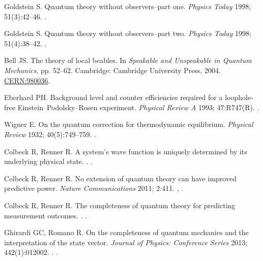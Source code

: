 \documentclass[DIV=calc,fontsize=12pt]{scrartcl} %
\theoremstyle{definition}
\theoremstyle{plain}
\begin{document}
\begin{thebibliography}{999}
Goldstein S.
\newblock Quantum theory without observers--part one.
\newblock \emph{Physics Today} 1998; 51(3):42--46.
\newblock \href {http://dx.doi.org/10.1063/1.882184}
{}.

Goldstein S.
\newblock Quantum theory without observers--part two.
\newblock \emph{Physics Today} 1998; 51(4):38--42.
\newblock \href {http://dx.doi.org/10.1063/1.882241}
{}.

Bell JS.
\newblock The theory of local beables.
\newblock In \emph{Speakable and Unspeakable in Quantum Mechanics}, pp.
52--62. Cambridge: Cambridge University Press, 2004.
\newblock \href{https://cds.cern.ch/record/980036}{CERN:980036}.

Eberhard PH.
\newblock Background level and counter efficiencies required for a loophole-free Einstein--Podolsky--Rosen experiment.
\newblock \emph{Physical Review A} 1993; 47:R747(R).
\newblock \href {http://dx.doi.org/10.1103/PhysRevA.47.R747}
{}.

Wigner E.
\newblock On the quantum correction for thermodynamic equilibrium.
\newblock \emph{Physical Review} 1932; 40(5):749--759.
\newblock \href {http://dx.doi.org/10.1103/PhysRev.40.749}
{}.

Colbeck R, Renner R.
\newblock A system's wave function is uniquely determined by its underlying physical state.
.
\newblock \href {http://arxiv.org/abs/1312.7353} {}.

Colbeck R, Renner R.
\newblock No extension of quantum theory can have improved predictive power.
\newblock \emph{Nature Communications} 2011; 2:411.
\newblock \href {http://arxiv.org/abs/1005.5173} {},
\href {http://dx.doi.org/10.1038/ncomms1416} {}.

Colbeck R, Renner R.
\newblock The completeness of quantum theory for predicting measurement outcomes.
.
\newblock \href {http://arxiv.org/abs/1208.4123} {}.

Ghirardi GC, Romano R.
\newblock On the completeness of quantum mechanics and the interpretation of
the state vector.
\newblock \emph{Journal of Physics: Conference Series} 2013; 442(1):012002.
.
\newblock \href {http://dx.doi.org/10.1088/1742-6596/442/1/012002}
{}.


\end{thebibliography}
\end{document}
